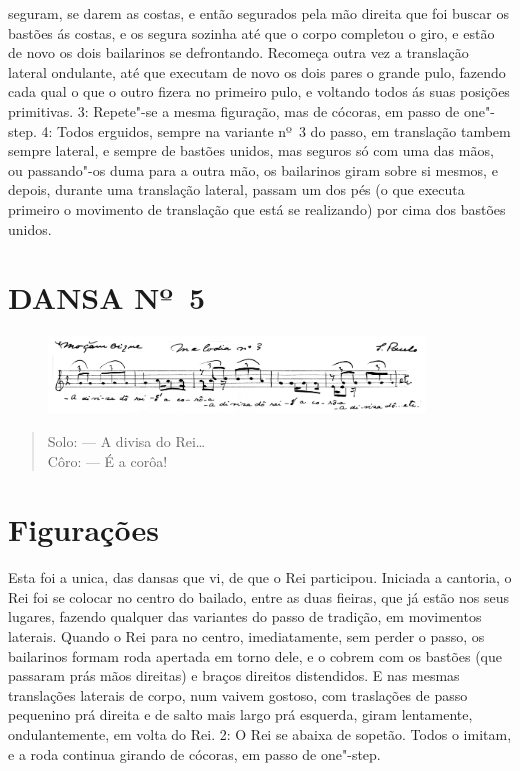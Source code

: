 seguram, se darem as costas, e então segurados pela mão direita que foi
buscar os bastões ás costas, e os segura sozinha até que o corpo
completou o giro, e estão de novo os dois bailarinos se defrontando.
Recomeça outra vez a translação lateral ondulante, até que executam de
novo os dois pares o grande pulo, fazendo cada qual o que o outro fizera
no primeiro pulo, e voltando todos ás suas posições primitivas. 3:
Repete"-se a mesma figuração, mas de cócoras, em passo de one"-step. 4:
Todos erguidos, sempre na variante nº~3 do passo, em translação tambem
sempre lateral, e sempre de bastões unidos, mas seguros só com uma das
mãos, ou passando"-os duma para a outra mão, os bailarinos giram sobre si
mesmos, e depois, durante uma translação lateral, passam um dos pés (o
que executa primeiro o movimento de translação que está se realizando)
por cima dos bastões unidos.

\pagebreak

\section{DANSA Nº~5}

\begin{figure}[!ht]
\centering
 \includegraphics[width=100mm]{./imgs/img7.png}
\end{figure}

\begin{verse}
Solo: --- A divisa do Rei\ldots{}\\
Côro: --- É a corôa!
\end{verse}

\section{Figurações}

Esta foi a unica, das dansas que vi, de que o Rei participou. Iniciada a
cantoria, o Rei foi se colocar no centro do bailado, entre as duas
fieiras, que já estão nos seus lugares, fazendo qualquer das variantes
do passo de tradição, em movimentos laterais. Quando o Rei para no
centro, imediatamente, sem perder o passo, os bailarinos formam roda
apertada em torno dele, e o cobrem com os bastões (que passaram prás
mãos direitas) e braços direitos distendidos. E nas mesmas translações
laterais de corpo, num vaivem gostoso, com traslações de passo pequenino
prá direita e de salto mais largo prá esquerda, giram lentamente,
ondulantemente, em volta do Rei. 2: O Rei se abaixa de sopetão. Todos o
imitam, e a roda continua girando de cócoras, em passo de one"-step.

